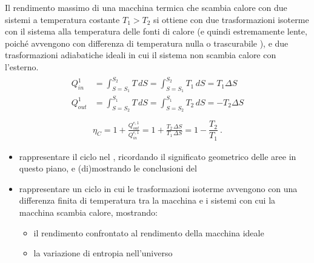 \documentclass[letterpaper,10pt,italian]{jupyterBook}
\begin{document}
\sphinxAtStartPar
Il rendimento massimo di una macchina termica che scambia calore con due sistemi a temperatura costante \(T_1 > T_2\) si ottiene con due trasformazioni isoterme con il sistema alla temperatura delle fonti di calore (e quindi estremamente lente, poiché avvengono con differenza di temperatura nulla o trascurabile  ), e due trasformazioni adiabatiche ideali in cui il sistema non scambia calore con l’esterno.
\begin{equation*}
\begin{split}\begin{aligned}
  Q^{1}_{in}  & = \int_{S = S_1}^{S_2} T \, dS = \int_{S = S_1}^{S_2} T_1 \, dS =   T_1 \Delta S \\
  Q^{1}_{out} & = \int_{S = S_2}^{S_1} T \, dS = \int_{S = S_2}^{S_1} T_2 \, dS = - T_2 \Delta S \\
\end{aligned}\end{split}
\end{equation*}\begin{equation*}
\begin{split}\eta_{C} = 1 + \frac{Q^{e,1}_{out}}{Q^{e,1}_{in}} = 1 + \frac{T_2 \, \Delta S}{T_1 \, \Delta S} = 1 - \dfrac{T_2}{T_1} \ .\end{split}
\end{equation*}
\sphinxAtStartPar
{}
\begin{itemize}
\item {} 
\sphinxAtStartPar
rappresentare il ciclo nel {\hyperref[\detokenize{ch/thermodynamics/principles-phase-diagrams:physics-hs-thermodynamics-foundation-principles-phase-diagrams-gas-1-ts}]{}}, ricordando il significato geometrico delle aree in questo piano, e (di)mostrando le conclusioni del {\hyperref[\detokenize{ch/thermodynamics/heat-engine-carnot:physics-hs-thermodynamics-heat-engine-carnot-td-cycle-theorem}]{}}

\item {} 
\sphinxAtStartPar
rappresentare un ciclo in cui le trasformazioni isoterme avvengono con una differenza finita di temperatura tra la macchina e i sistemi con cui la macchina scambia calore, mostrando:
\begin{itemize}
\item {} 
\sphinxAtStartPar
il rendimento confrontato al rendimento della macchina ideale

\item {} 
\sphinxAtStartPar
la variazione di entropia nell’universo

\end{itemize}

\end{itemize}
\end{document}
